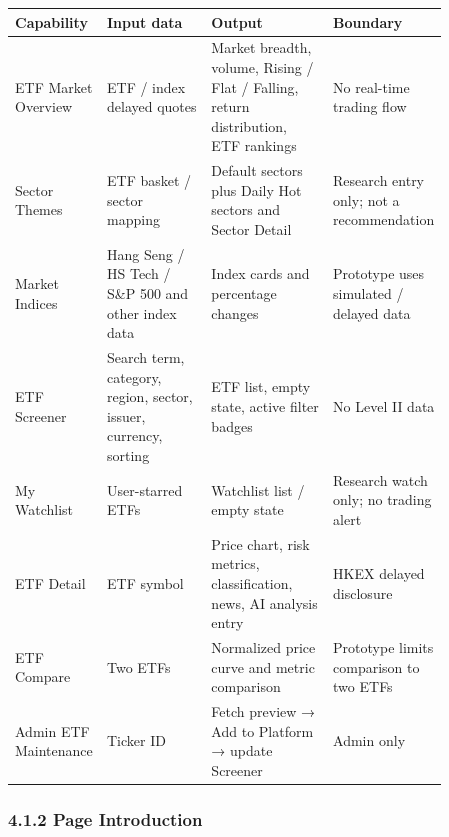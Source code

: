 \begingroup
\small
\begin{longtable}{L{0.18\linewidth}L{0.24\linewidth}L{0.28\linewidth}L{0.16\linewidth}}
\toprule
\textbf{Capability} & \textbf{Input data} & \textbf{Output} & \textbf{Boundary} \\
\midrule
ETF Market Overview & ETF / index delayed quotes & Market breadth, volume, Rising / Flat / Falling, return distribution, ETF rankings & No real-time trading flow \\
Sector Themes & ETF basket / sector mapping & Default sectors plus Daily Hot sectors and Sector Detail & Research entry only; not a recommendation \\
Market Indices & Hang Seng / HS Tech / S\&P 500 and other index data & Index cards and percentage changes & Prototype uses simulated / delayed data \\
ETF Screener & Search term, category, region, sector, issuer, currency, sorting & ETF list, empty state, active filter badges & No Level II data \\
My Watchlist & User-starred ETFs & Watchlist list / empty state & Research watch only; no trading alert \\
ETF Detail & ETF symbol & Price chart, risk metrics, classification, news, AI analysis entry & HKEX delayed disclosure \\
ETF Compare & Two ETFs & Normalized price curve and metric comparison & Prototype limits comparison to two ETFs \\
Admin ETF Maintenance & Ticker ID & Fetch preview → Add to Platform → update Screener & Admin only \\
\bottomrule
\end{longtable}
\endgroup

\subsubsection{4.1.2 Page Introduction}










